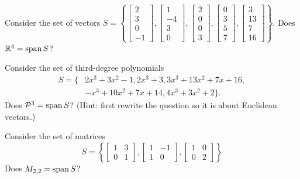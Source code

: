 \begin{activity}{5}
  Consider the set of vectors \(S=\left\{
  \begin{bmatrix}2\\3\\0\\-1\end{bmatrix},
  \begin{bmatrix}1\\-4\\3\\0\end{bmatrix},
  \begin{bmatrix}2\\0\\0\\3\end{bmatrix},
  \begin{bmatrix}0\\3\\5\\7\end{bmatrix},
  \begin{bmatrix}3\\13\\7\\16\end{bmatrix}
  \right\}
  \).
  Does
  \(\mathbb{R}^4=\operatorname{span} S\)?
\end{activity}

\begin{activity}{10}
  Consider the set of third-degree polynomials 
  \begin{align*}
  S=\{
  &2x^3+3x^2-1,
  2x^3+3,
  3x^3+13x^2+7x+16, \\
  &-x^3+10x^2+7x+14,
  4x^3+3x^2+2 \} .
  \end{align*}
  Does
  \(\mathcal{P}^3=\operatorname{span} S\)?
  (Hint: first rewrite the question so it is about Euclidean vectors.)
\end{activity}

\begin{activity}{5}
Consider the set of matrices
\[ S = \left\{
		\begin{bmatrix} 1 & 3 \\ 0 & 1 \end{bmatrix},
		\begin{bmatrix} 1 & -1 \\ 1 & 0 \end{bmatrix},
		\begin{bmatrix} 1 & 0 \\ 0 & 2 \end{bmatrix}
		\right\} \]
Does \(M_{2,2} = \operatorname{span} S\)?
\end{activity}


